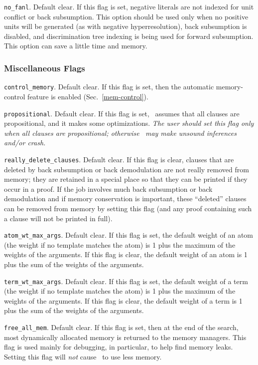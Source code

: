 \documentclass[11pt]{article}
\begin{document}
\noindent
\verb:no_fanl:.  Default clear.  If this flag is set,
negative literals are not indexed for unit conflict or back
subsumption.  This option should be used only when no positive units
will be generated (as with negative hyperresolution), back subsumption
is disabled, and discrimination tree indexing is being used for
forward subsumption.  This option can save a little time and memory.

\subsubsection{Miscellaneous Flags} \label{misc-flags}

\verb:control_memory:.  Default clear.  If this flag is set, then
the automatic memory-control feature is enabled (Sec.~\ref{mem-control}).

\noindent
\verb:propositional:.  Default clear.  If this flag is
set, \otter\ assumes that all clauses are propositional,
and it makes some optimizations.
{\em The user should set this flag only when all clauses are
propositional; otherwise \otter\ may make unsound inferences and/or
crash.}

\noindent
\verb:really_delete_clauses:.  Default clear.  If this flag is
clear, clauses that are deleted by back subsumption or back
demodulation are not really removed from memory; they are retained in
a special place so that they can be printed if they occur in a proof.
If the job involves much back subsumption or back demodulation and if
memory conservation is important, these ``deleted'' clauses can be removed
from memory by setting this flag (and any proof containing such a
clause will not be printed in full).

\noindent
\verb:atom_wt_max_args:.  Default clear.  If this flag is set, the
default weight of an atom (the weight if no template matches the atom)
is 1 plus the maximum of the weights of the arguments.  If this flag is
clear, the default weight of an atom is 1 plus the sum of the weights of
the arguments.

\noindent
\verb:term_wt_max_args:.  Default clear.  If this flag is set, the
default weight of a term (the weight if no template matches the atom)
is 1 plus the maximum of the weights of the arguments.  If this flag is
clear, the default weight of a term is 1 plus the sum of the weights of
the arguments.

\noindent
\verb:free_all_mem:.  Default clear.  If this flag is set, then
at the end of the search, most dynamically allocated memory is
returned to the memory managers.  This flag is used mainly for
debugging, in particular, to help find memory leaks.
Setting this flag will {\em not} cause \otter\ to use less memory.
\end{document}

